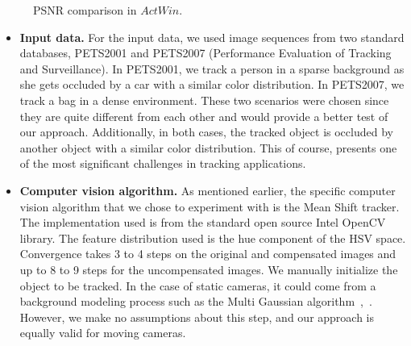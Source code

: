 \documentclass{article}
\begin{document}
\begin{itemize}
\begin{figure}[t]
					
				\caption{PSNR comparison in $ActWin$.} 		
				
			\end{figure}	

\begin{itemize}
\item \textbf{Input data.}  For the input data, we used image sequences from two standard databases, PETS2001 and PETS2007 (Performance Evaluation of Tracking and Surveillance).  In PETS2001, we track a person in a sparse background as she gets occluded by a car with a similar color distribution.  In PETS2007, we track a bag in a dense environment.  These two scenarios were chosen since they are quite different from each other and would provide a better test of our approach.  Additionally, in both cases, the tracked object is occluded by another object with a similar color distribution.  This of course, presents one of the most significant challenges in tracking applications.   
\item \textbf{Computer vision algorithm.}  As mentioned earlier, the specific computer vision algorithm that we chose to experiment with is the Mean Shift tracker.  The implementation used is from the standard open source Intel OpenCV library.  The feature distribution used is the hue component of the HSV space.  Convergence takes 3 to 4 steps on the original and compensated images and up to 8 to 9 steps for the uncompensated images.  We manually initialize the object to be tracked.  In the case of static cameras, it could come from a background modeling process such as the Multi Gaussian algorithm~\cite{2000_JNL_MG_Stauffer},~\cite{2005_JNL_SURVEYchangeDetection_Radke}.  However, we make no assumptions about this step, and our approach is equally valid for moving cameras. 


\end{itemize}
\end{itemize}
\end{document}
